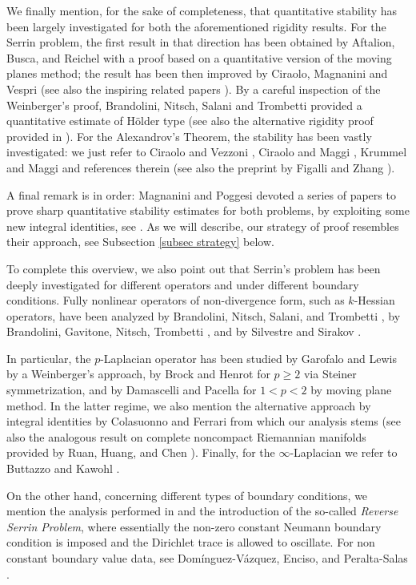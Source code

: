 \documentclass[10pt,a4paper]{amsart}
\numberwithin{equation}{section}
\begin{document}
We finally mention, for the sake of completeness, that quantitative stability has been largely investigated for both the aforementioned rigidity results. For the Serrin problem, the first result in that direction has been obtained by Aftalion, Busca, and Reichel \cite{abr1999} with a proof based on a quantitative version of the moving planes method; the result has been then improved by Ciraolo, Magnanini and Vespri \cite{cmv} (see also the inspiring related papers \cite{cms2015,cms2016}). By a careful inspection of the Weinberger’s proof, Brandolini, Nitsch, Salani and Trombetti \cite{bnst08} provided a quantitative estimate of H\"older type (see also the alternative rigidity proof provided in \cite{bnst}). For the Alexandrov's Theorem, the stability has been vastly investigated: we just refer to Ciraolo and Vezzoni \cite{cv18}, Ciraolo and Maggi \cite{cm2017}, Krummel and Maggi \cite{km2017} and references therein (see also the preprint by Figalli and Zhang \cite{fz2026pre}).

A final remark is in order: Magnanini and Poggesi devoted a series of papers to prove sharp quantitative stability estimates for both problems, by exploiting some new integral identities, see \cite{mapo19,mp2020,mp23}. As we will describe, our strategy of proof resembles their approach, see Subsection \ref{subsec strategy} below.

To complete this overview, we also point out that Serrin's problem has been deeply investigated for different operators and under different boundary conditions. Fully nonlinear operators of non-divergence form, such as $k$-Hessian operators, have been analyzed by Brandolini, Nitsch, Salani, and Trombetti \cite{bnst}, by Brandolini, Gavitone, Nitsch, Trombetti \cite{bgnt}, and by Silvestre and Sirakov \cite{ss}. 

In particular, the $p$-Laplacian operator has been studied by Garofalo and Lewis \cite{gl} by a Weinberger’s approach, by Brock and Henrot \cite{bh} for $p\geq 2$ via Steiner symmetrization, and by Damascelli and Pacella \cite{dp} for $1< p< 2$ by moving plane method. In the latter regime, we also mention the alternative approach by integral identities by Colasuonno and Ferrari \cite{CoFe20} from which our analysis stems (see also the analogous result on complete noncompact Riemannian manifolds provided by Ruan, Huang, and Chen \cite{RuHuCh24}). Finally, for the $\infty$-Laplacian we refer to Buttazzo and Kawohl \cite{bk2011}. 

On the other hand, concerning different types of boundary conditions, we mention the analysis performed in \cite{mmp} and the introduction of the so-called \textit{Reverse Serrin Problem}, where essentially the non-zero constant Neumann boundary condition is imposed and the Dirichlet trace is allowed to oscillate. For non constant boundary value data, see Dom\'inguez-V\'azquez, Enciso, and Peralta-Salas \cite{dep23}. 
\end{document}
